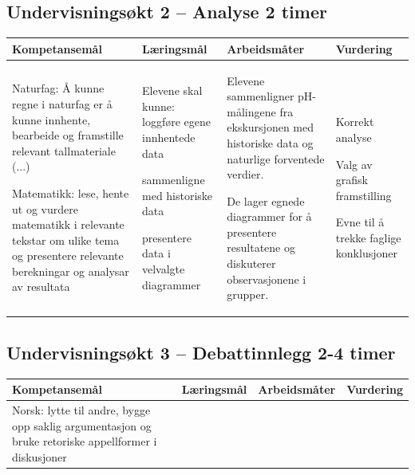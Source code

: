 \documentclass[a4paper,12pt]{article}
\begin{document}
\begin{landscape}
\newpage

\subsection*{Undervisningsøkt 2 – Analyse 2 timer}

\begin{tabular}{|p{5cm}|p{6cm}|p{8cm}|p{6cm}|}
\hline
\textbf{Kompetansemål} & \textbf{Læringsmål} & \textbf{Arbeidsmåter} & \textbf{Vurdering} \\
\hline
Naturfag: Å kunne regne i naturfag er å kunne innhente, bearbeide og framstille relevant tallmateriale (...)\newline

Matematikk: lese, hente ut og vurdere matematikk i relevante tekstar om ulike tema og presentere relevante berekningar og analysar av resultata
& 
Elevene skal kunne: loggføre egene innhentede data \newline

sammenligne med historiske data\newline

presentere data i velvalgte diagrammer
& 
Elevene sammenligner pH-målingene fra ekskursjonen med historiske data og naturlige forventede verdier.\newline

De lager egnede diagrammer for å presentere resultatene og diskuterer observasjonene i grupper.
& 
Korrekt analyse\newline

Valg av grafisk framstilling\newline

Evne til å trekke faglige konklusjoner
\\
\hline
\end{tabular}

\newpage

\subsection*{Undervisningsøkt 3 – Debattinnlegg 2-4 timer}

\begin{tabular}{|p{5cm}|p{6cm}|p{8cm}|p{6cm}|}
\hline
\textbf{Kompetansemål} & \textbf{Læringsmål} & \textbf{Arbeidsmåter} & \textbf{Vurdering} \\
\hline
Norsk: lytte til andre, bygge opp saklig argumentasjon og bruke retoriske appellformer i diskusjoner\newline


\end{tabular}
\end{landscape}
\end{document}
